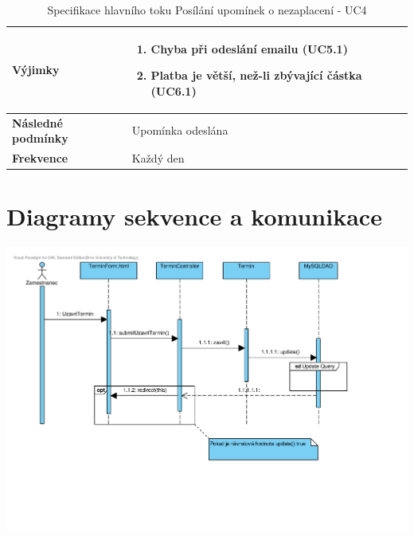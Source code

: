 \documentclass[12pt,a4paper,titlepage,final]{report}
\begin{document}
\begin{table}[h!]
\begin{center}
\begin{tabular}{ | p{4.2cm} | p{12.2cm} | }
    \textbf{Výjimky} & 
    \vspace{-3.5mm}
    \begin{enumerate}
		\itemsep0em 
		\item Chyba při odeslání emailu (UC5.1)
		\item Platba je větší, než-li zbývající částka (UC6.1)
	\end{enumerate}
    \\ \hline 
        
    \textbf{Následné podmínky} & Upomínka odeslána
    \\ \hline    
    
	\textbf{Frekvence} & Každý den
	\\ \hline		
    \end{tabular}
	\end{center}	
	\caption{Specifikace hlavního toku Posílání upomínek o nezaplacení - UC4}  
\end{table}


		
\section{Diagramy sekvence a komunikace}

\begin{center}
	\captionsetup{type=figure}
	\includegraphics[width=17cm]{img/uzavreni-terminu.pdf}
\end{center}
\end{document}
